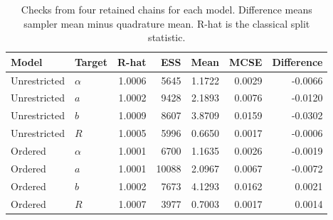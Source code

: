 \begin{table}[htbp]
\centering
\caption{Checks from four retained chains for each model. Difference means sampler mean minus quadrature mean. R-hat is the classical split statistic.}\label{tab:diagnostics}
\small
\begin{tabular}{llrrrrr}
\toprule
Model & Target & R-hat & ESS & Mean & MCSE & Difference \\
\midrule
Unrestricted & $\alpha$ & 1.0006 & 5645 & 1.1722 & 0.0029 & -0.0066 \\
Unrestricted & $a$ & 1.0002 & 9428 & 2.1893 & 0.0076 & -0.0120 \\
Unrestricted & $b$ & 1.0009 & 8607 & 3.8709 & 0.0159 & -0.0302 \\
Unrestricted & $R$ & 1.0005 & 5996 & 0.6650 & 0.0017 & -0.0006 \\
Ordered & $\alpha$ & 1.0001 & 6700 & 1.1635 & 0.0026 & -0.0019 \\
Ordered & $a$ & 1.0001 & 10088 & 2.0967 & 0.0067 & -0.0072 \\
Ordered & $b$ & 1.0002 & 7673 & 4.1293 & 0.0162 & 0.0021 \\
Ordered & $R$ & 1.0007 & 3977 & 0.7003 & 0.0017 & 0.0014 \\
\bottomrule
\end{tabular}
\end{table}
